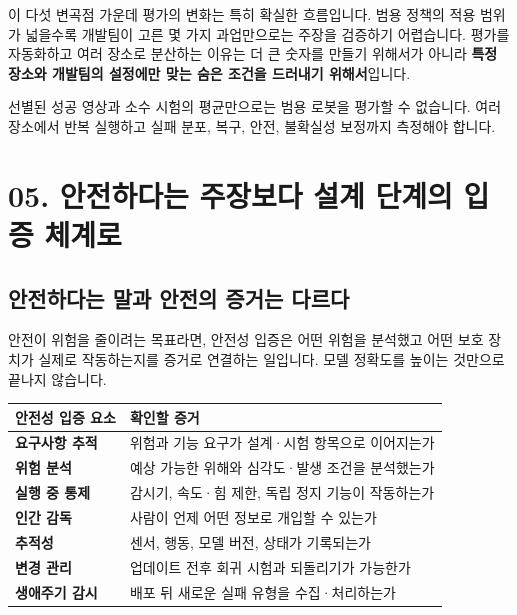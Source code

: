 \documentclass[11pt,openany]{book}
\begin{document}
\begin{profbox}
이 다섯 변곡점 가운데 평가의 변화는 특히 확실한 흐름입니다. 범용 정책의 적용 범위가 넓을수록 개발팀이 고른 몇 가지 과업만으로는 주장을 검증하기 어렵습니다. 평가를 자동화하고 여러 장소로 분산하는 이유는 더 큰 숫자를 만들기 위해서가 아니라 \textbf{특정 장소와 개발팀의 설정에만 맞는 숨은 조건을 드러내기 위해서}입니다.
\end{profbox}

\begin{translationbox}
선별된 성공 영상과 소수 시험의 평균만으로는 범용 로봇을 평가할 수 없습니다. 여러 장소에서 반복 실행하고 실패 분포, 복구, 안전, 불확실성 보정까지 측정해야 합니다.
\end{translationbox}

\section*{05. 안전하다는 주장보다 설계 단계의 입증 체계로}

\subsection*{안전하다는 말과 안전의 증거는 다르다}

안전이 위험을 줄이려는 목표라면, 안전성 입증은 어떤 위험을 분석했고 어떤 보호 장치가 실제로 작동하는지를 증거로 연결하는 일입니다. 모델 정확도를 높이는 것만으로 끝나지 않습니다.

\begin{center}
\begin{tabularx}{\textwidth}{>{\raggedright\arraybackslash\sffamily\bfseries\color{deepblue}}p{}>{\raggedright\arraybackslash}X}
\toprule
안전성 입증 요소 & 확인할 증거 \\
\midrule
요구사항 추적 & 위험과 기능 요구가 설계·시험 항목으로 이어지는가 \\
위험 분석 & 예상 가능한 위해와 심각도·발생 조건을 분석했는가 \\
실행 중 통제 & 감시기, 속도·힘 제한, 독립 정지 기능이 작동하는가 \\
인간 감독 & 사람이 언제 어떤 정보로 개입할 수 있는가 \\
추적성 & 센서, 행동, 모델 버전, 상태가 기록되는가 \\
변경 관리 & 업데이트 전후 회귀 시험과 되돌리기가 가능한가 \\
생애주기 감시 & 배포 뒤 새로운 실패 유형을 수집·처리하는가 \\
\bottomrule
\end{tabularx}
\end{center}
\end{document}
